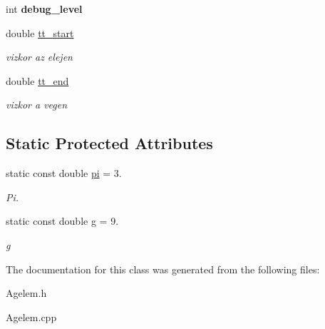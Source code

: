 \begin{DoxyCompactItemize}
\item 
int {\bfseries debug\+\_\+level}\hypertarget{class_agelem_a18e84a58b3a1f45465e27e1afdf2f2a1}{}\label{class_agelem_a18e84a58b3a1f45465e27e1afdf2f2a1}

\item 
double \hyperlink{class_agelem_a09ea41e75493961eb2b1d755c74e95f6}{tt\+\_\+start}\hypertarget{class_agelem_a09ea41e75493961eb2b1d755c74e95f6}{}\label{class_agelem_a09ea41e75493961eb2b1d755c74e95f6}

\begin{DoxyCompactList}\small\item\em vizkor az elejen \end{DoxyCompactList}\item 
double \hyperlink{class_agelem_af07d516eda5f43a676f9f417436e0d9c}{tt\+\_\+end}\hypertarget{class_agelem_af07d516eda5f43a676f9f417436e0d9c}{}\label{class_agelem_af07d516eda5f43a676f9f417436e0d9c}

\begin{DoxyCompactList}\small\item\em vizkor a vegen \end{DoxyCompactList}\end{DoxyCompactItemize}
\subsection*{Static Protected Attributes}
\begin{DoxyCompactItemize}
\item 
static const double \hyperlink{class_agelem_a994d67cc2ee3be36159a774681625134}{pi} = 3.\hypertarget{class_agelem_a994d67cc2ee3be36159a774681625134}{}\label{class_agelem_a994d67cc2ee3be36159a774681625134}

\begin{DoxyCompactList}\small\item\em Pi. \end{DoxyCompactList}\item 
static const double \hyperlink{class_agelem_ab382ba1135a9aae3a5fd817f5746be43}{g} = 9.\hypertarget{class_agelem_ab382ba1135a9aae3a5fd817f5746be43}{}\label{class_agelem_ab382ba1135a9aae3a5fd817f5746be43}

\begin{DoxyCompactList}\small\item\em g \end{DoxyCompactList}\end{DoxyCompactItemize}


The documentation for this class was generated from the following files\+:\begin{DoxyCompactItemize}
\item 
Agelem.\+h\item 
Agelem.\+cpp\end{DoxyCompactItemize}
